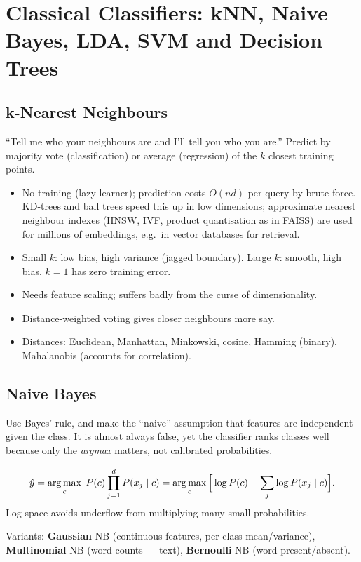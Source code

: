 \chapter[Classical Classifiers]{Classical Classifiers: kNN, Naive Bayes, LDA, SVM and Decision Trees}

\section{k-Nearest Neighbours}
\begin{intuition}
``Tell me who your neighbours are and I'll tell you who you are.'' Predict by majority vote (classification) or average (regression) of the $k$ closest training points.
\end{intuition}
\begin{itemize}
  \item No training (lazy learner); prediction costs $O(nd)$ per query by brute force. KD-trees and ball trees speed this up in low dimensions; approximate nearest neighbour indexes (HNSW, IVF, product quantisation as in FAISS) are used for millions of embeddings, e.g.\ in vector databases for retrieval.
  \item Small $k$: low bias, high variance (jagged boundary). Large $k$: smooth, high bias. $k=1$ has zero training error.
  \item Needs feature scaling; suffers badly from the curse of dimensionality.
  \item Distance-weighted voting gives closer neighbours more say.
  \item Distances: Euclidean, Manhattan, Minkowski, cosine, Hamming (binary), Mahalanobis (accounts for correlation).
\end{itemize}

\section{Naive Bayes}
\begin{intuition}
Use Bayes' rule, and make the ``naive'' assumption that features are independent given the class. It is almost always false, yet the classifier ranks classes well because only the \emph{argmax} matters, not calibrated probabilities.
\end{intuition}
\[\hat y=\operatorname*{arg\,max}_c\;P(c)\prod_{j=1}^dP(x_j\mid c)=\operatorname*{arg\,max}_c\Big[\log P(c)+\sum_j\log P(x_j\mid c)\Big].\]
Log-space avoids underflow from multiplying many small probabilities.

Variants: \textbf{Gaussian} NB (continuous features, per-class mean/variance), \textbf{Multinomial} NB (word counts --- text), \textbf{Bernoulli} NB (word present/absent).

